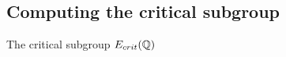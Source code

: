 \documentclass[handout]{beamer}
\begin{document}





\subsection{Computing the critical subgroup}

\begin{frame}{The critical subgroup $E_{crit}(\mathbb{Q})$}






\end{frame}
\end{document}

